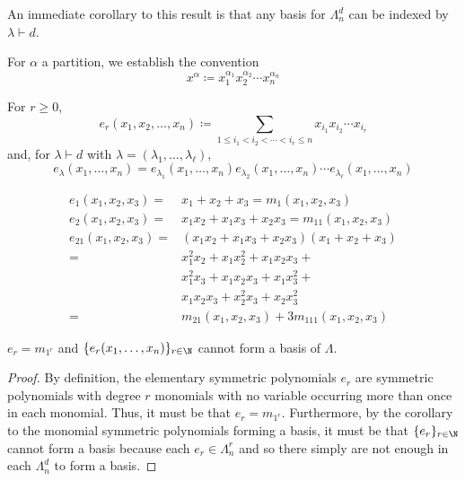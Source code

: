 \documentclass[11pt,leqno,oneside]{amsart}
\numberwithin{thm}{section}
\newcommand{\defeq}{\coloneqq}
\newcommand{\partitionof}{\vdash}
\newcommand{\sym}{\Lambda}
\begin{document}
\begin{cor}
  An immediate corollary to this result is that any basis for
  \(\sym_n^d\) can be indexed by \(\lambda \partitionof d\).
\end{cor}
\begin{defn}
  For \(\alpha\) a partition, we establish the convention \[
    x^\alpha \defeq x_1^{\alpha_1} x_2^{\alpha_2} \cdots x_n^{\alpha_n}
  \]
\end{defn}
\begin{defn}
  For \(r \geq 0\),  \[
    e_r(x_1, x_2, \ldots, x_n) \defeq \sum_{1 \leq i_1 < i_2 < \cdots < i_r
    \leq n} x_{i_1} x_{i_2} \cdots x_{i_r}
  \]
  and, for \(\lambda \partitionof d\) with \(\lambda = (\lambda_1,
  \ldots, \lambda_\ell)\), \[
    e_\lambda(x_1, \ldots, x_n) = e_{\lambda_1}(x_1, \ldots, x_n)
    e_{\lambda_2}(x_1, \ldots, x_n) \cdots e_{\lambda_\ell}(x_1,
    \ldots, x_n)
  \]
\end{defn}
\begin{example}
  \begin{align*}
    e_1(x_1, x_2, x_3) = & x_1+x_2+x_3 = m_1(x_1, x_2, x_3)\\
    e_2(x_1, x_2, x_3) = & x_1x_2+x_1x_3+x_2x_3 = m_{11}(x_1, x_2,
                         x_3)\\
    e_{21}(x_1,x_2,x_3) = & (x_1x_2+x_1x_3+x_2x_3)(x_1+x_2+x_3)\\
                       = & x_1^2x_2+x_1x_2^2+x_1x_2x_3+\\
                       & x_1^2x_3+x_1x_2x_3+x_1x_3^2+\\
                       & x_1x_2x_3+x_2^2x_3+x_2x_3^2\\
    = & m_{21}(x_1,x_2,x_3) + 3m_{111}(x_1,x_2,x_3)
  \end{align*}
\end{example}
\begin{prop}
  \(e_r = m_{1^r}\) and \(\{e_r(x_1, \ldots, x_n)\}_{r \in \N}\)
  cannot form a basis of \(\sym\).
\end{prop}
\begin{proof}
  By definition, the elementary symmetric polynomials \(e_r\) are
  symmetric polynomials with degree \(r\) monomials with no variable
  occurring more than once in each monomial. Thus, it must be that
  \(e_r = m_{1^r}\). Furthermore, by the corollary to the monomial
  symmetric polynomials forming a basis, it must be that \(\{e_r\}_{r
    \in \N}\) cannot form a basis because each \(e_r \in \sym_n^r\)
  and so there simply are not enough in each \(\sym_n^d\) to form a basis.
\end{proof}
\end{document}
